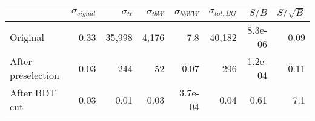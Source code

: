 \begin{tabular}{lrrrrrrr}
\toprule
{} &  $\sigma_{signal}$ &  $\sigma_{tt}$ &  $\sigma_{tbW}$ &  $\sigma_{bbWW}$ &  $\sigma_{tot,BG}$ &   $S/B$ &  $S/\sqrt{B}$ \\
\midrule
Original           &               0.33 &          35,998 &           4,176 &              7.8 &             40,182 & 8.3e-06 &          0.09 \\
After preselection &               0.03 &             244 &              52 &             0.07 &                296 & 1.2e-04 &          0.11 \\
After BDT cut      &               0.03 &            0.01 &            0.03 &          3.7e-04 &               0.04 &    0.61 &           7.1 \\
\bottomrule
\end{tabular}

